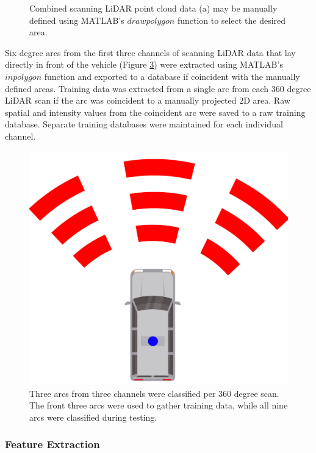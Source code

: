 \documentclass[numbered,pdftex]{ohio-etd}
\begin{document}
{{{{\begin{figure}[H]
\begin{subfigure}{0.45\textwidth}
						\caption[Bean Hollow Road Camera View]{}
						\label{fig:area_selected}
					\end{subfigure}
					\caption[Manual Area Selection Process]{Combined scanning LiDAR point cloud data (a) may be manually defined using MATLAB's $drawpolygon$ function to select the desired area. }
					\label{fig:Area_Selection_Process}
				\end{figure}
				
				{Six degree arcs from the first three channels of scanning LiDAR data that lay directly in front of the vehicle (Figure \ref{fig:area_example}) were extracted using MATLAB's $inpolygon$ function and exported to a database if coincident with the manually defined areas. Training data was extracted from a single arc from each 360 degree LiDAR scan if the arc was coincident to a manually projected 2D area. Raw spatial and intensity values from the coincident arc were saved to a raw training database. Separate training databases were maintained for each individual channel.}
				
				\begin{figure}[H]
					\centering
					\includegraphics[width=0.25\linewidth]{Defense_Images/area_example}
					\caption[Areas to Classify]{Three arcs from three channels were classified per 360 degree scan. The front three arcs were used to gather training data, while all nine arcs were classified during testing. }
					\label{fig:area_example}
				\end{figure}
				

			} %
		
		\newpage
			
			\subsubsection{Feature Extraction}\label{sec:Feat_Extract} {
			
}}}}
\end{document}
